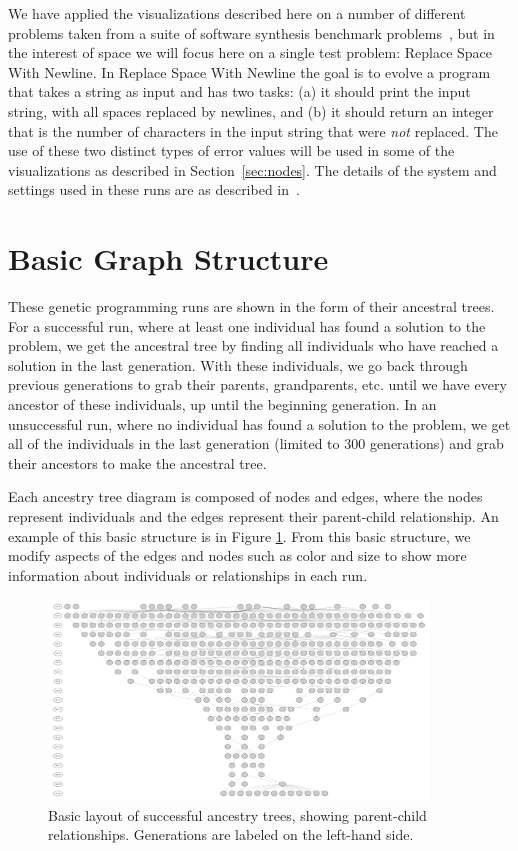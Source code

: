 \documentclass{sig-alternate}
\begin{document}
We have applied the visualizations described here on a 
number of different problems taken from a suite of software synthesis benchmark 
problems~\cite{Helmuth:2015:GECCO}, but in the interest of space we
will focus here on a single test problem: Replace Space With Newline.
In Replace Space With Newline the goal is to evolve a program that takes a string
as input and has two tasks: (a) it should print the input string, with all spaces
replaced by newlines, and (b) it should return an integer that is the number of
characters in the input string that were \emph{not} replaced. The use of
these two distinct types of error values will be used in some of the visualizations
as described in Section~\ref{sec:nodes}. The details of the system and
settings used in these runs are as described in~\cite{Helmuth:2015:GECCO}.

\section{Basic Graph Structure}
\label{sec:basics}
These genetic programming runs are shown in the form of their ancestral trees. For a successful run, where at least one individual has found a solution to the problem, we get the ancestral tree by finding all individuals who have reached a solution in the last generation. With these individuals, we go back through previous generations to grab their parents, grandparents, etc. until we have every ancestor of these individuals, up until the beginning generation. In an unsuccessful run, where no individual has found a solution to the problem, we get all of the individuals in the last generation (limited to 300 generations) and grab their ancestors to make the ancestral tree. 

Each ancestry tree diagram is composed of nodes and edges, where the nodes represent individuals and the edges represent their parent-child relationship. An example of this basic structure is in Figure \ref{fig:lexRun0Basic}. From this basic structure, we modify aspects of the edges and nodes such as color and size to show more information about individuals or relationships in each run.

\begin{figure}
	\begin{center}
		\includegraphics[width=0.9\textwidth]{../Figures/run0_basic_structure.pdf}
	\end{center}
	\caption{Basic layout of successful ancestry trees, showing parent-child relationships. Generations are labeled on the left-hand side.}
	\label{fig:lexRun0Basic}
\end{figure}
\end{document}
